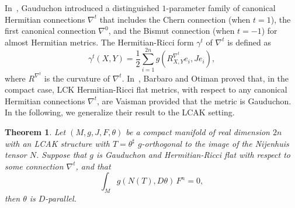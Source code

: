 \documentclass[a4paper,11pt]{amsart}
\newtheorem{thm}{Theorem}
\theoremstyle{definition}
\renewcommand{\[}{\begin{equation*}}
\renewcommand{\]}{\end{equation*}}
\begin{document}
In~\cite{MR1456265}, Gauduchon introduced a distinguished $1$-parameter family of canonical Hermitian connections $\nabla^t$ that includes the Chern connection (when $t=1$), the first canonical connection $\nabla^0$, and the Bismut connection (when $t=-1$) for almost Hermitian metrics. The Hermitian-Ricci form $\gamma^t$ of $\nabla^t$ is defined as $$\gamma^t(X,Y)=\frac{1}{2}\sum\limits_{i=1}^{2n}g(R^{\nabla^t}_{X,Y}e_i,Je_i),$$
where $R^{\nabla^t}$ is the curvature of $\nabla^t$. In~\cite{barbaro2025calabiyaulocallyconformallykahler}, Barbaro and Otiman proved that, in the compact case, LCK Hermitian-Ricci flat metrics, with respect to any canonical Hermitian connections $\nabla^t$, are Vaisman provided that the metric is Gauduchon. In the following, we generalize their result to the LCAK setting.
\begin{thm}\label{Gauduchon-Ricci-flat}
Let $(M, g, J, F, \theta)$ be a compact manifold of real dimension $2n$ with an LCAK structure with $T=\theta^\sharp$ $g$-orthogonal to the image of the Nijenhuis tensor $N$. Suppose that $g$ is Gauduchon and Hermitian-Ricci flat with respect to some connection $\nabla^t$, and that $$\int_Mg(N(T),D\theta)\,F^n=0,$$ then $\theta$ is $D$-parallel.
\end{thm}
\end{document}
